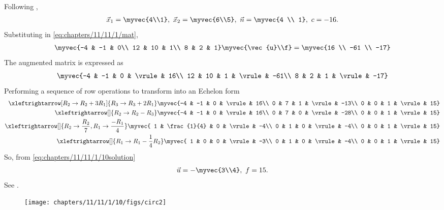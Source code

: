 	Following 
,
\begin{align}
	\label{eq:chapters/11/11/1/10circPoints}
	\vec{x}_{1} = \myvec{4\\1},\ \vec{x}_{2} = \myvec{6\\5},\
	\vec{n} = \myvec{4 \\ 1},\  c= -16.
\end{align}
Substituting  in
	\eqref{eq:chapters/11/11/1/mat},
\begin{align}
	\myvec{-4 & -1 & 0\\
	       12 & 10 & 1\\
	        8 &  2 & 1}
	\myvec{\vec{u}\\f} = 
	\myvec{16 \\ -61 \\ -17}
\end{align}
The augmented matrix is expressed as
\begin{align}
	\myvec{-4 & -1 & 0 & \vrule & 16\\
	       12 & 10 & 1 & \vrule & -61\\
	        8 &  2 & 1 & \vrule & -17}
\end{align}
Performing a sequence of row operations to transform into an Echelon form
\begin{align}
	\xleftrightarrow[R_2\rightarrow R_2+3R_1]{{R_3\rightarrow R_3+2R_1}}
	\myvec{-4 & -1 & 0 & \vrule & 16\\
	        0 &  7 & 1 & \vrule & -13\\
	        0 &  0 & 1 & \vrule & 15}\\
	\xleftrightarrow[]{{R_2\rightarrow R_2-R_3}}
	\myvec{-4 & -1 & 0 & \vrule & 16\\
	        0 &  7 & 0 & \vrule & -28\\
	        0 &  0 & 1 & \vrule & 15}\\
	\xleftrightarrow[]{{R_2\rightarrow \frac{R_2}{7},R_1\rightarrow \frac{-R_1}{4}}}
	\myvec{ 1 & \frac{1}{4} & 0 & \vrule & -4\\
	        0 &  1 & 0 & \vrule & -4\\
	        0 &  0 & 1 & \vrule & 15}\\
	\label{eq:chapters/11/11/1/10solution}	
	\xleftrightarrow[]{{R_1\rightarrow R_1-\frac{1}{4}R_2}}
	\myvec{ 1 &  0 & 0 & \vrule & -3\\
	        0 &  1 & 0 & \vrule & -4\\
	        0 &  0 & 1 & \vrule & 15}
\end{align}
So, from \eqref{eq:chapters/11/11/1/10solution}
\begin{align}
	\vec{u} = -\myvec{3\\4},\
	f = 15.
\end{align}
See .
\begin{figure}[H]
	\begin{center} 
	    \texttt{[image: chapters/11/11/1/10/figs/circ2]}
	\end{center}
\caption{}
\label{fig:chapters/11/11/1/10Fig1}
\end{figure}





